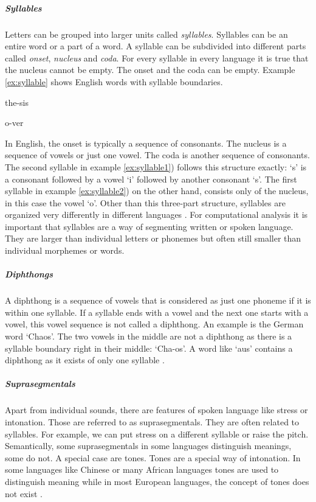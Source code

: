 \subparagraph{Syllables} Letters can be grouped into larger units called \textit{syllables}. Syllables can be an entire word or a part of a word. A syllable can be subdivided into different parts called \textit{onset}, \textit{nucleus} and \textit{coda}. For every syllable in every language it is true that the nucleus cannot be empty. The onset and the coda can be empty. Example \ref{ex:syllable} shows English words with syllable boundaries.
\begin{covsubexamples}[preamble={English syllables: the hyphen denotes a syllable boundary.}]
\label{ex:syllable}
\item \label{ex:syllable1} the-sis
\item \label{ex:syllable2} o-ver
\end{covsubexamples}
In English, the onset is typically a sequence of consonants. The nucleus is a sequence of vowels or just one vowel. The coda is another sequence of consonants. The second syllable in example \ref{ex:syllable1}) follows this structure exactly: `s' is a consonant followed by a vowel `i' followed by another consonant `s'. The first syllable in example \ref{ex:syllable2}) on the other hand, consists only of the nucleus, in this case the vowel `o'. Other than this three-part structure, syllables are organized very differently in different languages \citep{Intro.2007}. For computational analysis it is important that syllables are a way of segmenting written or spoken language. They are larger than individual letters or phonemes but often still smaller than individual morphemes or words. 

\subparagraph{Diphthongs}
A diphthong is a sequence of vowels that is considered as just one phoneme if it is within one syllable. If a syllable ends with a vowel and the next one starts with a vowel, this vowel sequence is not called a diphthong. An example is the German word `Chaos'. The two vowels in the middle are not a diphthong as there is a syllable boundary right in their middle: `Cha-os'. A word like `aus' contains a diphthong as it exists of only one syllable \citep{Intro.2007}. 

\subparagraph{Suprasegmentals} Apart from individual sounds, there are features of spoken language like stress or intonation. Those are referred to as suprasegmentals. They are often related to syllables. For example, we can put stress on a different syllable or raise the pitch. Semantically, some suprasegmentals in some languages distinguish meanings, some do not. A special case are tones. Tones are a special way of intonation. In some languages like Chinese or many African languages tones are used to distinguish meaning while in most European languages, the concept of tones does not exist \citep{Intro.2007}.

